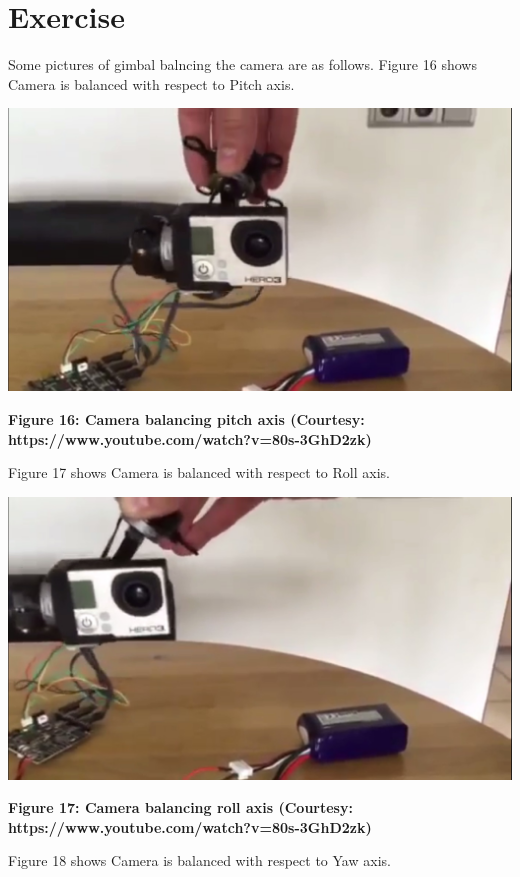 \documentclass[11pt,a4paper]{article}
\begin{document}
	\section{Exercise}
	Some pictures of gimbal balncing the camera are as follows. Figure 16 shows Camera is balanced with respect to Pitch axis.
	\begin{center}
		\includegraphics[scale=0.4]{balancing_pitch_axis.jpg}
	\end{center}
	\begin{center}
		\textbf{Figure 16: Camera balancing pitch axis (Courtesy:  https://www.youtube.com/watch?v=80s-3GhD2zk)}
	\end{center}
	Figure 17 shows Camera is balanced with respect to Roll axis.
	\begin{center}
		\includegraphics[scale=0.4]{balancing_roll_axis.jpg}
	\end{center}
	\begin{center}
		\textbf{Figure 17: Camera balancing roll axis (Courtesy:  https://www.youtube.com/watch?v=80s-3GhD2zk)}
	\end{center}
	Figure 18 shows Camera is balanced with respect to Yaw axis.
\end{document}

